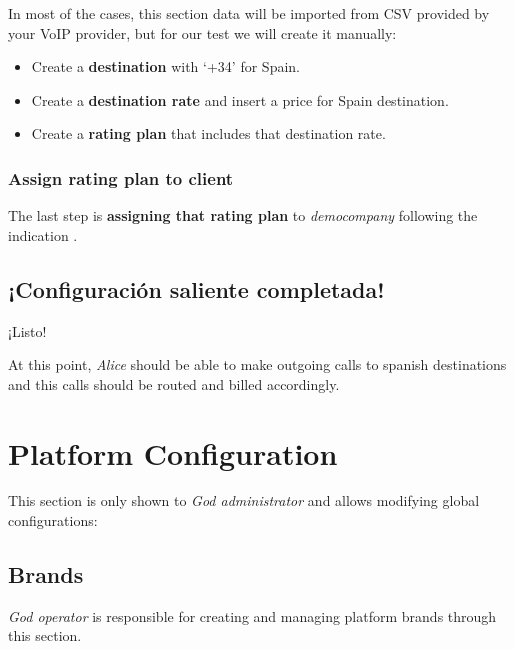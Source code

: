 \documentclass[letterpaper,10pt,spanish]{sphinxmanual}
\begin{document}
In most of the cases, this section data will be imported from CSV provided by your
VoIP provider, but for our test we will create it manually:
\begin{itemize}
\item {} 
Create a \textbf{destination} with `+34' for Spain.

\item {} 
Create a \textbf{destination rate} and insert a price for Spain destination.

\item {} 
Create a \textbf{rating plan} that includes that destination rate.

\end{itemize}


\subsection{Assign rating plan to client}
\label{getting_started/external_outgoing_calls/noplan_nocall:assign-rating-plan-to-client}
The last step is \textbf{assigning that rating plan} to \emph{democompany} following the indication
{\hyperref[administration_portal/brand/billing/rating_plans:assigning\string-rating\string-plans\string-to\string-clients]{}}.


\section{¡Configuración saliente completada!}
\label{getting_started/external_outgoing_calls/finish:outgoing-configuration-complete}\label{getting_started/external_outgoing_calls/finish::doc}
¡Listo!

At this point, \emph{Alice} should be able to make outgoing calls to
spanish destinations and this calls should be routed and billed accordingly.


\chapter{Platform Configuration}
\label{administration_portal/platform/index::doc}\label{administration_portal/platform/index:platform-configuration}
This section is only shown to \emph{God administrator} and allows modifying global configurations:


\section{Brands}
\label{administration_portal/platform/brands:brands}\label{administration_portal/platform/brands::doc}
\emph{God operator} is responsible for creating and managing platform brands through this section.
\end{document}
